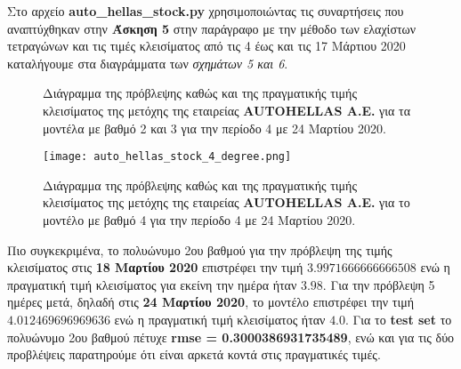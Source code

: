 \documentclass[Second Project.tex]{subfiles}
\begin{document}
Στο αρχείο \textlatin{\textbf{auto\_hellas\_stock.py}} χρησιμοποιώντας τις συναρτήσεις που αναπτύχθηκαν στην 
\textbf{Άσκηση 5} στην παράγραφο με την μέθοδο των ελαχίστων τετραγώνων και τις τιμές κλεισίματος από τις 4 έως 
και τις 17 Μάρτιου 2020 καταλήγουμε στα διαγράμματα των \textit{σχημάτων 5 και 6}.  
\begin{figure}[h!]
    \centering
    \captionsetup{justification=centering}
    \quad
    \caption{ Διάγραμμα της πρόβλεψης καθώς και της πραγματικής τιμής κλεισίματος της μετόχης της εταιρείας 
    \textlatin{\textbf{AUTOHELLAS A.E.}} για τα μοντέλα με βαθμό 2 και 3 για την περίοδο 4 με 24 Μαρτίου 2020. }
\end{figure}
\vspace{10px}
\begin{figure}[h!]
    \centering
    \captionsetup{justification=centering}
    \begin{center}
        \texttt{[image: auto\_hellas\_stock\_4\_degree.png]}    
        \caption{Διάγραμμα της πρόβλεψης καθώς και της πραγματικής τιμής κλεισίματος της μετόχης της εταιρείας 
        \textlatin{\textbf{AUTOHELLAS A.E.}} για το μοντέλο με βαθμό 4 για την περίοδο 4 με 24 Μαρτίου 2020.}
    \end{center}
\end{figure}

Πιο συγκεκριμένα, το πολυώνυμο 2ου βαθμού για την πρόβλεψη της τιμής κλεισίματος στις \textbf{18 Μαρτίου 2020} 
επιστρέφει την τιμή $3.9971666666666508$ ενώ η πραγματική τιμή κλεισίματος για εκείνη την ημέρα ήταν
$3.98$. Για την πρόβλεψη 5 ημέρες μετά, δηλαδή στις \textbf{24 Μαρτίου 2020}, το μοντέλο επιστρέφει την τιμή 
$4.012469696969636$ ενώ η πραγματική τιμή κλεισίματος ήταν $4.0$. Για το \textlatin{\textbf{test set}} το
πολυώνυμο 2ου βαθμού πέτυχε \textbf{\textlatin{rmse} = 0.3000386931735489}, ενώ και για τις δύο προβλέψεις παρατηρούμε
ότι είναι αρκετά κοντά στις πραγματικές τιμές. 
\end{document}
